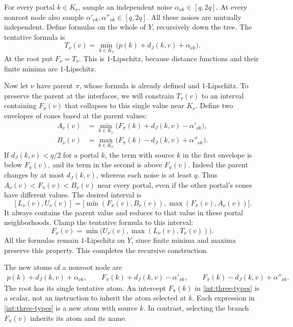 For every portal $k\in K_\nu$, sample an independent noise
$\alpha_{\nu k}\in[q,2q]$. At every nonroot node also sample
$\alpha'_{\nu k},\alpha''_{\nu k}\in[q,2q]$. All these noises are
mutually independent. Define formulas on the whole of $Y$, recursively
down the tree. The tentative formula is
\[
 T_\nu(v)=\min_{k\in K_\nu}
       \bigl(p(k)+d_J(k,v)+\alpha_{\nu k}\bigr).
\]
At the root put $F_\nu=T_\nu$. This is $1$-Lipschitz, because
distance functions and their finite minima are $1$-Lipschitz.

Now let $\nu$ have parent $\pi$, whose formula is already defined
and $1$-Lipschitz. To preserve the parent at the interfaces, we will
constrain $T_\nu(v)$ to an interval containing $F_\pi(v)$ that
collapses to this single value near $K_\nu$. Define two envelopes
of cones based at the parent values:
\begin{align*}
 A_\nu(v)&=\min_{k\in K_\nu}
     \bigl(F_\pi(k)+d_J(k,v)-\alpha'_{\nu k}\bigr),\\
 B_\nu(v)&=\max_{k\in K_\nu}
     \bigl(F_\pi(k)-d_J(k,v)+\alpha''_{\nu k}\bigr).
\end{align*}
If $d_J(k,v)<q/2$ for a portal $k$, the term with source $k$
in the first envelope is below $F_\pi(v)$, and its term in the
second is above $F_\pi(v)$. Indeed the parent changes by at most
$d_J(k,v)$, whereas each noise is at least $q$.
Thus $A_\nu(v)<F_\pi(v)<B_\nu(v)$ near every portal, even if
the other portal's cones have different values. The desired interval is
\[
 [L_\nu(v),U_\nu(v)]
 =\bigl[\min(F_\pi(v),B_\nu(v)),
        \max(F_\pi(v),A_\nu(v))\bigr].
\]
It always contains the parent value and reduces to that value in
these portal neighborhoods. Clamp the tentative formula to this interval:
\[
 F_\nu(v)=\min\bigl(U_\nu(v),\max(L_\nu(v),T_\nu(v))\bigr).
\]
All the formulas remain $1$-Lipschitz on $Y$, since finite minima and
maxima preserve this property. This completes the recursive construction.

The new atoms of a nonroot node are
\begin{align}
 p(k)+d_J(k,v)+\alpha_{\nu k},\qquad
 F_\pi(k)+d_J(k,v)-\alpha'_{\nu k},\qquad
 F_\pi(k)-d_J(k,v)+\alpha''_{\nu k}.
 \label{int:three-types}
\end{align}
The root has its single tentative atom. An intercept $F_\pi(k)$ in
\eqref{int:three-types} is a scalar, not an instruction to inherit the
atom selected at $k$. Each expression in \eqref{int:three-types} is a
new atom with source $k$. In contrast, selecting the branch
$F_\pi(v)$ inherits its atom and its name.


